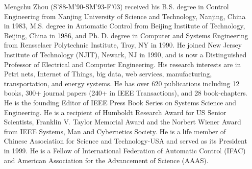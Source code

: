\documentclass[journal]{IEEEtran}
\begin{document}
\begin{IEEEbiography}{Mengchu Zhou}
(S'88-M'90-SM'93-F'03) received his B.S. degree in Control Engineering from Nanjing University of Science and Technology, Nanjing, China in 1983, M.S. degree in Automatic Control from Beijing Institute of Technology, Beijing, China in 1986, and Ph. D. degree in Computer and Systems Engineering from Rensselaer Polytechnic Institute, Troy, NY in 1990.  He joined New Jersey Institute of Technology (NJIT), Newark, NJ in 1990, and is now a Distinguished Professor of Electrical and Computer Engineering. His research interests are in Petri nets, Internet of Things, big data, web services, manufacturing, transportation, and energy systems.  He has over 620 publications including 12 books, 300+ journal papers (240+ in IEEE Transactions), and 28 book-chapters. He is the founding Editor of IEEE Press Book Series on Systems Science and Engineering. He is a recipient of Humboldt Research Award for US Senior Scientists, Franklin V. Taylor Memorial Award and the Norbert Wiener Award from IEEE Systems, Man and Cybernetics Society. He is a life member of Chinese Association for Science and Technology-USA and served as its President in 1999. He is a Fellow of International Federation of Automatic Control (IFAC) and American Association for the Advancement of Science (AAAS).
\end{IEEEbiography}
\end{document}
